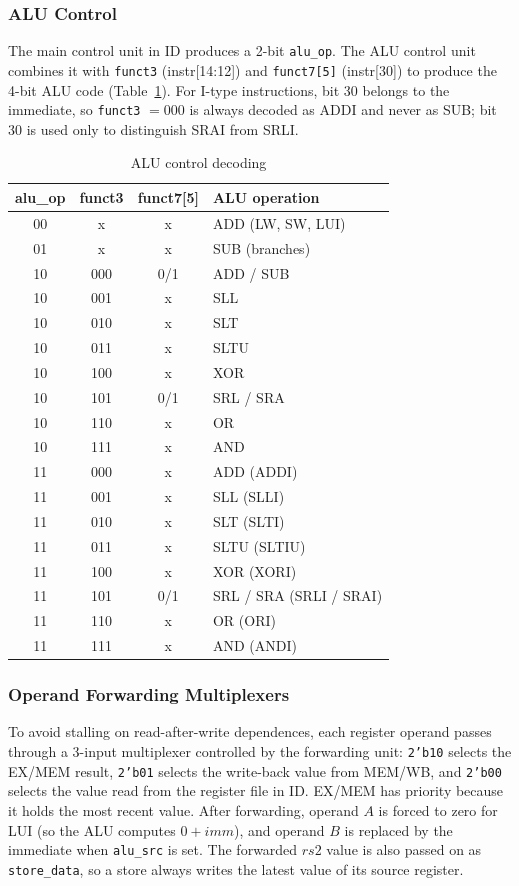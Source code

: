 \subsubsection{ALU Control}
The main control unit in ID produces a 2-bit \texttt{alu\_op}. The ALU control
unit combines it with \texttt{funct3} (instr[14:12]) and \texttt{funct7[5]}
(instr[30]) to produce the 4-bit ALU code (Table~\ref{tab:alu_ctrl}).
For I-type instructions, bit 30 belongs to the immediate, so \texttt{funct3}
$=000$ is always decoded as ADDI and never as SUB; bit 30 is used only to
distinguish SRAI from SRLI.

\begin{table}[htbp]
\caption{ALU control decoding}
\label{tab:alu_ctrl}
\centering
\begin{tabular}{|c|c|c|l|}
\hline
\textbf{alu\_op} & \textbf{funct3} & \textbf{funct7[5]} & \textbf{ALU operation} \\
\hline
00 & x   & x & ADD (LW, SW, LUI) \\
01 & x   & x & SUB (branches) \\
\hline
10 & 000 & 0/1 & ADD / SUB \\
10 & 001 & x & SLL \\
10 & 010 & x & SLT \\
10 & 011 & x & SLTU \\
10 & 100 & x & XOR \\
10 & 101 & 0/1 & SRL / SRA \\
10 & 110 & x & OR \\
10 & 111 & x & AND \\
\hline
11 & 000 & x & ADD (ADDI) \\
11 & 001 & x & SLL (SLLI) \\
11 & 010 & x & SLT (SLTI) \\
11 & 011 & x & SLTU (SLTIU) \\
11 & 100 & x & XOR (XORI) \\
11 & 101 & 0/1 & SRL / SRA (SRLI / SRAI) \\
11 & 110 & x & OR (ORI) \\
11 & 111 & x & AND (ANDI) \\
\hline
\end{tabular}
\end{table}

\subsubsection{Operand Forwarding Multiplexers}
To avoid stalling on read-after-write dependences, each register operand passes
through a 3-input multiplexer controlled by the forwarding unit:
\texttt{2'b10} selects the EX/MEM result, \texttt{2'b01} selects the
write-back value from MEM/WB, and \texttt{2'b00} selects the value read from
the register file in ID. EX/MEM has priority because it holds the most recent
value. After forwarding, operand $A$ is forced to zero for LUI (so the ALU
computes $0 + \mathit{imm}$), and operand $B$ is replaced by the immediate when
\texttt{alu\_src} is set. The forwarded $rs2$ value is also passed on as
\texttt{store\_data}, so a store always writes the latest value of its source
register.

